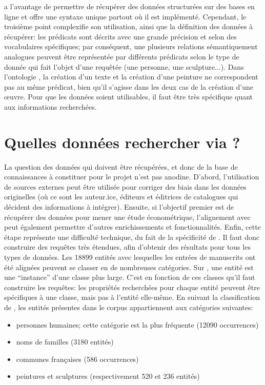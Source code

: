 \sparql{} a l'avantage de permettre de récupérer des données structurées sur des bases en ligne et offre une syntaxe unique partout où il est implémenté. Cependant, le troisième point complexifie son utilisation, ainsi que la définition des données à récupérer: les prédicats sont décrits avec une grande précision et selon des vocabulaires spécifiques; par conséquent, une plusieurs relations sémantiquement analogues peuvent être représentée par différents prédicats selon le type de donnée qui fait l'objet d'une requêtée (une personne, une sculpture...). Dans l'ontologie \wkd{}, la création d'un texte et la création d'une peinture ne correspondent pas au même prédicat, bien qu'il s'agisse dans les deux cas de la création d'une œuvre. Pour que les données soient utilisables, il faut être très spécifique quant aux informations recherchées. 

\section{Quelles données rechercher via \sparql?}
La question des données qui doivent être récupérées, et donc de la base de connaissances à constituer pour le projet \mssktb{} n'est pas anodine. D'abord, l'utilisation de sources externes peut être utilisée pour corriger des biais dans les données originelles (où ce sont les auteur.ice, éditeurs et éditrices de catalogues qui décident des informations à intégrer). Ensuite, si l'objectif premier est de récupérer des données pour mener une étude économétrique, l'alignement avec \wkd{} peut également permettre d'autres enrichissements et fonctionnalités. Enfin, cette étape représente une difficulté technique, du fait de la spécificité de \sparql{}. Il faut donc construire des requêtes très étendues, afin d'obtenir des résultats pour tous les types de données. Les 18899 entités avec lesquelles les entrées de manuscrits ont été alignées peuvent se classer en de nombreuses catégories. Sur \wkd{}, une entité est une \enquote{instance} d'une classe plus large. C'est en fonction de ces classes qu'il faut construire les requêtes: les propriétés recherchées pour chaque entité peuvent être spécifiques à une classe, mais pas à l'entité elle-même. En suivant la classification de \wkd{}, les entités présentes dans le corpus appartiennent aux catégories suivantes:

\begin{itemize}
	\item personnes humaines; cette catégorie est la plus fréquente (12090 occurrences)
	\item noms de familles (3180 entités)
	\item communes françaises (586 occurrences)
	\item peintures et sculptures (respectivement 520 et 236 entités)
\end{itemize}

